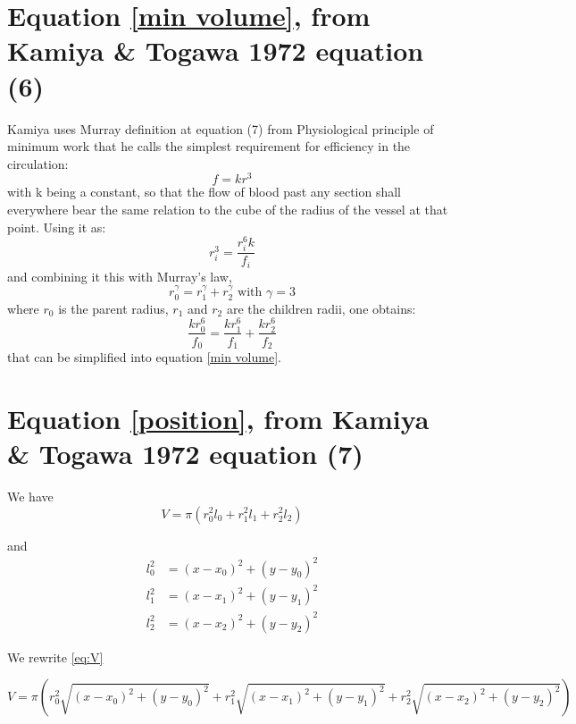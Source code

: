\documentclass[a4paper, 11pt]{article} %
\newcommand{\sqlen}[1]{\ensuremath{(x - x_{#1})^2 + (y-y_{#1})^2}}
\begin{document}
\begin{appendices}
\section{Equation \eqref{min volume}, from Kamiya \& Togawa 1972 equation  (6)}\label{appendix:1}
Kamiya uses Murray definition at equation (7) from Physiological principle of minimum work \cite{murray1926physiological} that he calls the simplest requirement for efficiency in the circulation:
\begin{equation*}
f = k r^3
\end{equation*}
with k being a constant, so that the flow of blood past any section shall everywhere bear the same relation to the cube of the radius of the vessel at that point. Using it as:
\begin{equation*}
r_i^3 = \frac{r_i^6 k}{f_i}
\end{equation*}
and combining it this with Murray's law,
\begin{equation*}
r_0^\gamma = r_1^\gamma + r_2^\gamma \text{ with } \gamma = 3
\end{equation*}
 where $r_0$ is the parent radius, $r_1$ and $r_2$ are the children radii, one obtains:
\begin{equation*}
\frac{k r_0^6}{f_0} = \frac{k r_1^6}{f_1} + \frac{k r_2^6}{f_2}
\end{equation*}
that can be simplified into equation \eqref{min volume}.


\section{Equation \eqref{position}, from Kamiya \& Togawa 1972 equation  (7) }\label{appendix:2}

We have
\begin{equation*}
\label{eq:V}
V = \pi(r_0^2 l_0 + r_1^2 l_1 + r_2^2 l_2)
\end{equation*}

and
\begin{align*}
l_0^2 &= \sqlen{0} \\
l_1^2 &= \sqlen{1} \\
l_2^2 &= \sqlen{2} 
\end{align*}

We rewrite \eqref{eq:V}

\begin{equation*}
V = \pi(r_0^2 \sqrt{\sqlen{0}} + r_1^2 \sqrt{\sqlen{1}} + r_2^2 \sqrt{\sqlen{2}})
\end{equation*}


\end{appendices}
\end{document}
